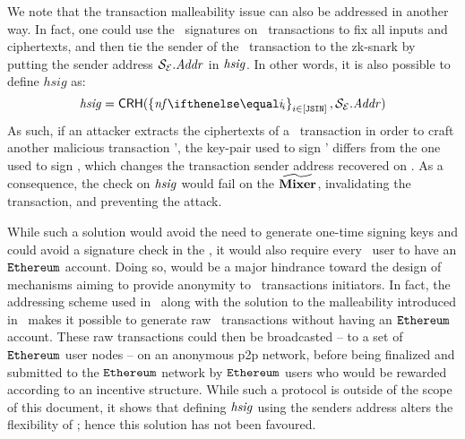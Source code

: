 \begin{remark}
    We note that the transaction malleability issue can also be addressed in another way. In fact, one could use the \ecdsa~signatures on \ethereum~transactions to fix all inputs and ciphertexts, and then tie the sender of the \ethereum~transaction to the zk-snark by putting the sender address $\mathcal{{S}_{E}}.\mathit{Addr}$ in $\mathit{hsig}$. In other words, it is also possible to define $hsig$ as:
    \[
        \hsig = \crh(\indexedset{\nf{i}}{i \in [\jsin]}, \eparty{S}.\addr)
    \]
    As such, if an attacker extracts the ciphertexts of a \zethTx~transaction in order to craft another malicious transaction \zethTx', the key-pair used to sign \zethTx' differs from the one used to sign \zethTx, which changes the transaction sender address recovered on \mixer. As a consequence, the check on $\mathit{hsig}$ would fail on the $\widetilde{\mathbf{Mixer}}$, invalidating the transaction, and preventing the attack.

    While such a solution would avoid the need to generate one-time signing keys and could avoid a signature check in the \mixer, it would also require every \zeth~user to have an $\texttt{Ethereum}{}$ account. Doing so, would be a major hindrance toward the design of mechanisms aiming to provide anonymity to \zeth~transactions initiators. In fact, the addressing scheme used in \zeth~along with the solution to the malleability introduced in \zcash~makes it possible to generate raw \zeth~transactions without having an $\texttt{Ethereum}{}$ account. These raw transactions could then be broadcasted -- to a set of $\texttt{Ethereum}{}$ user nodes -- on an anonymous p2p network, before being finalized and submitted to the $\texttt{Ethereum}{}$ network by $\texttt{Ethereum}{}$ users who would be rewarded according to an incentive structure. While such a protocol is outside of the scope of this document, it shows that defining $\mathit{hsig}$ using the senders address alters the flexibility of \zeth; hence this solution has not been favoured.
\end{remark}
